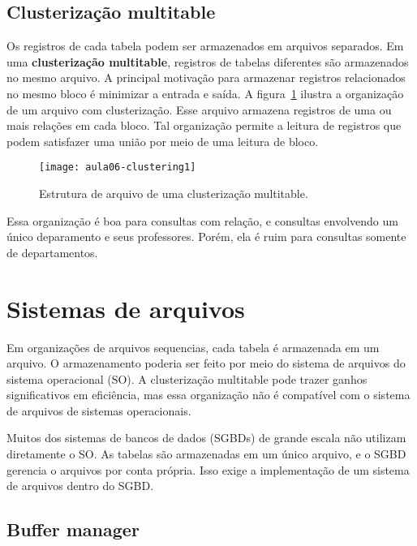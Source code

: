 \subsection{Clusterização multitable}

Os registros de cada tabela podem ser armazenados em arquivos separados.
Em uma \textbf{clusterização multitable}, registros de tabelas diferentes são armazenados no mesmo 
arquivo.
A principal motivação para armazenar registros relacionados no mesmo bloco é minimizar
a entrada e saída.
A figura~\ref{aula06:fig:clustering1} ilustra a organização de um arquivo com clusterização.
Esse arquivo armazena registros de uma ou mais relações em cada bloco.
Tal organização permite a leitura de registros que podem satisfazer uma união por meio de 
uma leitura de bloco.
%
\begin{figure}[!htb]
\centering
\texttt{[image: aula06-clustering1]}
\caption{Estrutura de arquivo de uma clusterização multitable.}
\label{aula06:fig:clustering1}
\end{figure}

Essa organização é boa para consultas com relação, e consultas envolvendo um único
deparamento e seus professores.
Porém, ela é ruim para consultas somente de departamentos.

\section{Sistemas de arquivos}

Em organizações de arquivos sequencias, cada tabela é armazenada em um arquivo.
O armazenamento poderia ser feito por meio do sistema de arquivos do sistema
operacional (SO).
A clusterização multitable pode trazer ganhos significativos em eficiência, mas 
essa organização não é compatível com o sistema de arquivos de sistemas operacionais.

Muitos dos sistemas de bancos de dados (SGBDs) de grande escala não utilizam diretamente o SO.
As tabelas são armazenadas em um único arquivo, e o SGBD gerencia o arquivos por conta própria.
Isso exige a implementação de um sistema de arquivos dentro do SGBD.

\subsection{Buffer manager}

